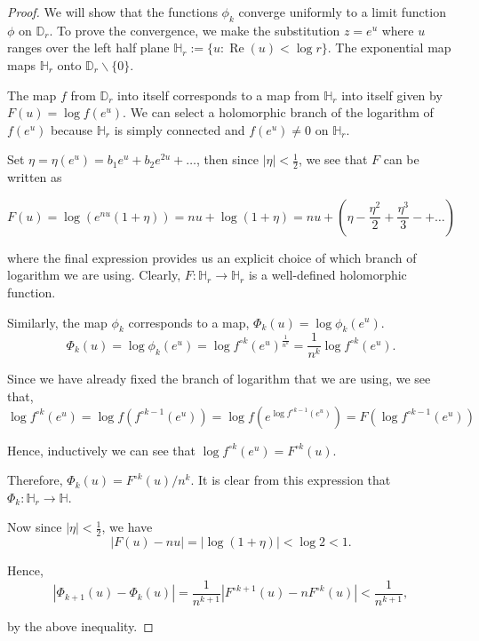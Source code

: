 \begin{proof}
We will show that the functions $\phi_{k}$ converge uniformly to a limit function $\phi$ on $\mathbb{D}_{r}$. To prove the convergence, we make the substitution $z=e^{u}$ where $u$ ranges over the left half plane $\mathbb{H}_{r}:=\{u: \operatorname{Re}(u)<\log r\}$. The exponential map maps $\mathbb{H}_{r}$ onto $\mathbb{D}_{r} \backslash\{0\}$.

The map $f$ from $\mathbb{D}_{r}$ into itself corresponds to a map from $\mathbb{H}_{r}$ into itself given by $F(u)=\log f\left(e^{u}\right)$. We can select a holomorphic branch of the logarithm of $f\left(e^{u}\right)$ because $\mathbb{H}_{r}$ is simply connected and $f\left(e^{u}\right) \neq 0$ on $\mathbb{H}_{r}$.

Set $\eta=\eta\left(e^{u}\right)=b_{1} e^{u}+b_{2} e^{2 u}+\ldots$, then since $|\eta|<\frac{1}{2}$, we see that $F$ can be written as

$$
F(u)=\log \left(e^{n u}(1+\eta)\right)=n u+\log (1+\eta)=n u+\left(\eta-\frac{\eta^{2}}{2}+\frac{\eta^{3}}{3}-+\ldots\right)
$$

where the final expression provides us an explicit choice of which branch of logarithm we are using. Clearly, $F: \mathbb{H}_{r} \rightarrow \mathbb{H}_{r}$ is a well-defined holomorphic function.

Similarly, the map $\phi_{k}$ corresponds to a map, $\Phi_{k}(u)=\log \phi_{k}\left(e^{u}\right)$.
$$
\Phi_{k}(u)=\log \phi_{k}\left(e^{u}\right)=\log f^{\circ k}\left(e^{u}\right)^{\frac{1}{n^{k}}}=\frac{1}{n^{k}} \log f^{\circ k}\left(e^{u}\right) .
$$

Since we have already fixed the branch of logarithm that we are using, we see that,
$$
\log f^{\circ k}\left(e^{u}\right)=\log f\left(f^{\circ k-1}\left(e^{u}\right)\right)=\log f\left(e^{\log f^{\circ k-1}\left(e^{u}\right)}\right)=F\left(\log f^{\circ k-1}\left(e^{u}\right)\right)
$$

Hence, inductively we can see that $\log f^{\circ k}\left(e^{u}\right)=F^{\circ k}(u)$.

Therefore, $\Phi_{k}(u)=F^{\circ k}(u) / n^{k}$. It is clear from this expression that $\Phi_{k}: \mathbb{H}_{r} \rightarrow \mathbb{H}$.

Now since $|\eta|<\frac{1}{2}$, we have
$$
|F(u)-n u|=|\log (1+\eta)|<\log 2<1.
$$

Hence,
$$
\left|\Phi_{k+1}(u)-\Phi_{k}(u)\right|=\frac{1}{n^{k+1}}\left|F^{\circ k+1}(u)-n F^{\circ k}(u)\right|<\frac{1}{n^{k+1}},
$$

by the above inequality.


\end{proof}
